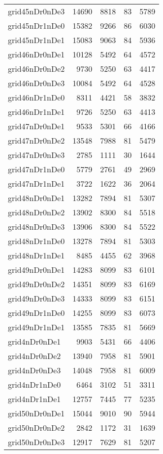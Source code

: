 \begin{longtable}{lrrrr}
grid45nDr0nDe3 & 14690 & 8818 & 83 & 5789 \\
grid45nDr1nDe0 & 15382 & 9266 & 86 & 6030 \\
grid45nDr1nDe1 & 15083 & 9063 & 84 & 5936 \\
grid46nDr0nDe1 & 10128 & 5492 & 64 & 4572 \\
grid46nDr0nDe2 & 9730 & 5250 & 63 & 4417 \\
grid46nDr0nDe3 & 10084 & 5492 & 64 & 4528 \\
grid46nDr1nDe0 & 8311 & 4421 & 58 & 3832 \\
grid46nDr1nDe1 & 9726 & 5250 & 63 & 4413 \\
grid47nDr0nDe1 & 9533 & 5301 & 66 & 4166 \\
grid47nDr0nDe2 & 13548 & 7988 & 81 & 5479 \\
grid47nDr0nDe3 & 2785 & 1111 & 30 & 1644 \\
grid47nDr1nDe0 & 5779 & 2761 & 49 & 2969 \\
grid47nDr1nDe1 & 3722 & 1622 & 36 & 2064 \\
grid48nDr0nDe1 & 13282 & 7894 & 81 & 5307 \\
grid48nDr0nDe2 & 13902 & 8300 & 84 & 5518 \\
grid48nDr0nDe3 & 13906 & 8300 & 84 & 5522 \\
grid48nDr1nDe0 & 13278 & 7894 & 81 & 5303 \\
grid48nDr1nDe1 & 8485 & 4455 & 62 & 3968 \\
grid49nDr0nDe1 & 14283 & 8099 & 83 & 6101 \\
grid49nDr0nDe2 & 14351 & 8099 & 83 & 6169 \\
grid49nDr0nDe3 & 14333 & 8099 & 83 & 6151 \\
grid49nDr1nDe0 & 14255 & 8099 & 83 & 6073 \\
grid49nDr1nDe1 & 13585 & 7835 & 81 & 5669 \\
grid4nDr0nDe1 & 9903 & 5431 & 66 & 4406 \\
grid4nDr0nDe2 & 13940 & 7958 & 81 & 5901 \\
grid4nDr0nDe3 & 14048 & 7958 & 81 & 6009 \\
grid4nDr1nDe0 & 6464 & 3102 & 51 & 3311 \\
grid4nDr1nDe1 & 12757 & 7445 & 77 & 5235 \\
grid50nDr0nDe1 & 15044 & 9010 & 90 & 5944 \\
grid50nDr0nDe2 & 2842 & 1172 & 31 & 1639 \\
grid50nDr0nDe3 & 12917 & 7629 & 81 & 5207 \\

\end{longtable}
